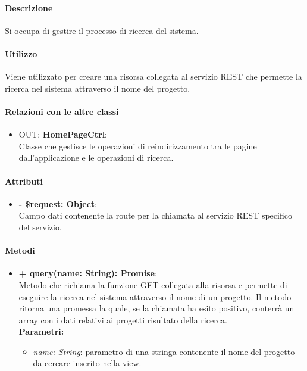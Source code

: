 		\paragraph{Descrizione}
		Si occupa di gestire il processo di ricerca del sistema.
		
		\paragraph{Utilizzo}
		Viene utilizzato per creare una risorsa collegata al servizio \gls{REST} che permette la ricerca nel sistema attraverso il nome del progetto.
		
		\paragraph{Relazioni con le altre classi}
		\begin{itemize}
			\item OUT: \textbf{HomePageCtrl}:\\
			Classe che gestisce le operazioni di reindirizzamento tra le pagine dall'applicazione e le operazioni di ricerca.
		\end{itemize}
		
		\paragraph{Attributi}
		\begin{itemize}
			\item \textbf{- \$request: Object}:\\
			Campo dati contenente la route per la chiamata al servizio \gls{REST} specifico del servizio.
		\end{itemize}	
		
		\paragraph{Metodi}
		\begin{itemize}
			\item \textbf{+ query(name: String): Promise}:\\
			Metodo che richiama la funzione GET collegata alla risorsa e permette di eseguire la ricerca nel sistema attraverso il nome di un progetto. Il metodo ritorna una promessa la quale, se la chiamata ha esito positivo, conterrà un array con i dati relativi ai progetti risultato della ricerca.\\
			\textbf{Parametri:}\\
			\begin{itemize}
				\item \textit{name: String}: parametro di una stringa contenente il nome del progetto da cercare inserito nella view.
			\end{itemize}
		\end{itemize}
\newpage
		
